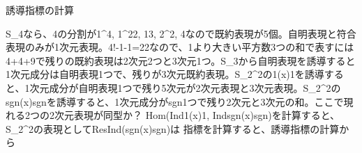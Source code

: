 誘導指標の計算

S_4なら、4の分割が1^4, 1^22, 13, 2^2, 4なので既約表現が5個。自明表現と符合表現のみが1次元表現。4!-1-1=22なので、1より大きい平方数3つの和で表すには4+4+9で残りの既約表現は2次元2つと3次元1つ。S_3から自明表現を誘導すると1次元成分は自明表現1つで、残りが3次元既約表現。S_2^2の1(x)1を誘導すると、1次元成分が自明表現1つで残り5次元が2次元表現と3次元表現。S_2^2のsgn(x)sgnを誘導すると、1次元成分がsgn1つで残り2次元と3次元の和。ここで現れる2つの2次元表現が同型か？
Hom(Ind1(x)1, Indsgn(x)sgn)を計算すると、S_2^2の表現としてResInd(sgn(x)sgn)は
指標を計算すると、誘導指標の計算から
